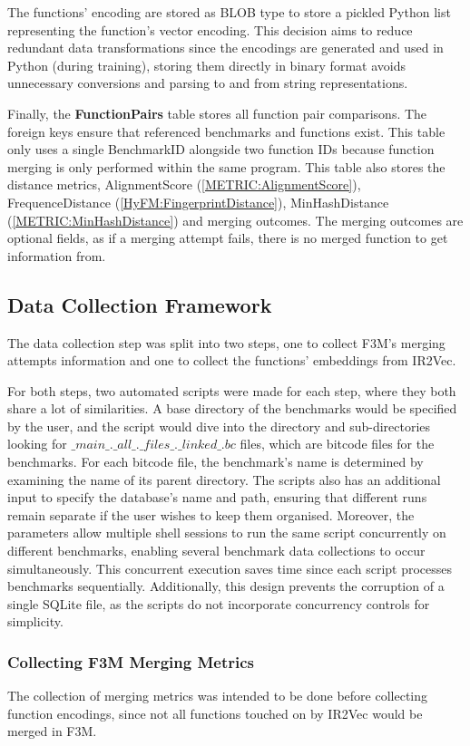 The functions' encoding are stored as BLOB type to store a pickled Python list representing the function's vector encoding. This decision aims to reduce redundant data transformations since the encodings are generated and used in Python (during training), storing them directly in binary format avoids unnecessary conversions and parsing to and from string representations.

Finally, the \textbf{FunctionPairs} table stores all function pair comparisons. The foreign keys ensure that referenced benchmarks and functions exist. This table only uses a single BenchmarkID alongside two function IDs because function merging is only performed within the same program. This table also stores the distance metrics, AlignmentScore (\ref{METRIC:AlignmentScore}), FrequenceDistance (\ref{HyFM:FingerprintDistance}), MinHashDistance (\ref{METRIC:MinHashDistance}) and merging outcomes. The merging outcomes are optional fields, as if a merging attempt fails, there is no merged function to get information from.

\subsection{Data Collection Framework}
The data collection step was split into two steps, one to collect F3M's merging attempts information and one to collect the functions' embeddings from IR2Vec.

For both steps, two automated scripts were made for each step, where they both share a lot of similarities. A base directory of the benchmarks would be specified by the user, and the script would dive into the directory and sub-directories looking for $\_main\_.\_all\_.\_files\_.\_linked\_.bc$ files, which are bitcode files for the benchmarks. For each bitcode file, the benchmark's name is determined by examining the name of its parent directory. The scripts also has an additional input to specify the database's name and path, ensuring that different runs remain separate if the user wishes to keep them organised. Moreover, the parameters allow multiple shell sessions to run the same script concurrently on different benchmarks, enabling several benchmark data collections to occur simultaneously. This concurrent execution saves time since each script processes benchmarks sequentially. Additionally, this design prevents the corruption of a single SQLite file, as the scripts do not incorporate concurrency controls for simplicity.


\subsubsection{Collecting F3M Merging Metrics}
The collection of merging metrics was intended to be done before collecting function encodings, since not all functions touched on by IR2Vec would be merged in F3M.

